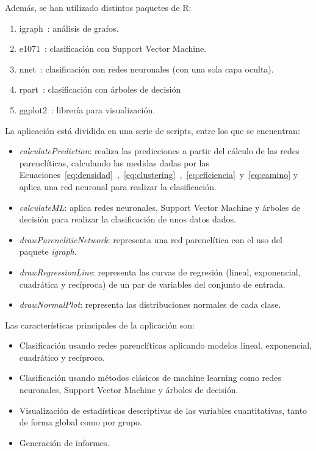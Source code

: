 Además, se han utilizado distintos paquetes de R:

\begin{enumerate}
	\item igraph~\cite{igraph}: análisis de grafos.
	\item e1071~\cite{e1071}: clasificación con Support Vector Machine.
	\item nnet~\cite{nnet}: clasificación con redes neuronales (con una sola capa oculta).
	\item rpart~\cite{rpart}: clasificación con árboles de decisión
	\item ggplot2~\cite{ggplot2}: librería para visualización. 
\end{enumerate}


La aplicación está dividida en una serie de scripts, entre los que se encuentran:

\begin{itemize}
	\item \textit{calculatePrediction}: realiza las predicciones a partir del cálculo de las redes parenclíticas, calculando las medidas dadas por las Ecuaciones~\ref{eq:densidad}~,~\ref{eq:clustering}~,~\ref{eq:eficiencia}~y~\ref{eq:camino} y aplica una red neuronal para realizar la clasificación.
	
	\item \textit{calculateML}: aplica redes neuronales, Support Vector Machine y árboles de decisión para realizar la clasificación de unos datos dados.
	
	\item \textit{drawParencliticNetwork}: representa una red parenclítica con el uso del paquete \textit{igraph}.
	
	\item \textit{drawRegressionLine}: representa las curvas de regresión (lineal, exponencial, cuadrática y recíproca) de un par de variables del conjunto de entrada.
	
	\item \textit{drawNormalPlot}: representa las distribuciones normales de cada clase. 
\end{itemize}

Las características principales de la aplicación son:

\begin{itemize}
	\item Clasificación usando redes parenclíticas aplicando modelos lineal, exponencial, cuadrático y recíproco.
	
	\item Clasificación usando métodos clásicos de machine learning como redes neuronales, Support Vector Machine y árboles de decisión.
	
	\item Visualización de estadísticas descriptivas de las variables cuantitativas, tanto de forma global como por grupo.
	
	\item Generación de informes.
\end{itemize}



